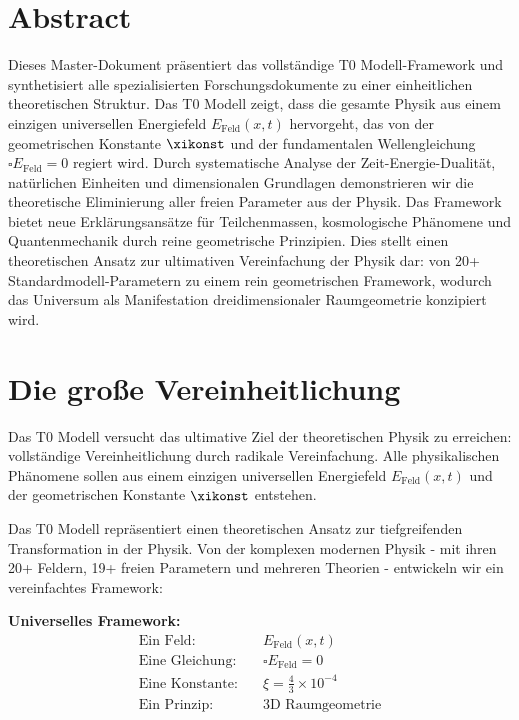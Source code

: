 
\section*{Abstract}
		Dieses Master-Dokument präsentiert das vollständige T0 Modell-Framework und synthetisiert alle spezialisierten Forschungsdokumente zu einer einheitlichen theoretischen Struktur. Das T0 Modell zeigt, dass die gesamte Physik aus einem einzigen universellen Energiefeld $E_{\text{Feld}}(x,t)$ hervorgeht, das von der geometrischen Konstante $\xikonst$ und der fundamentalen Wellengleichung $\square E_{\text{Feld}} = 0$ regiert wird. Durch systematische Analyse der Zeit-Energie-Dualität, natürlichen Einheiten und dimensionalen Grundlagen demonstrieren wir die theoretische Eliminierung aller freien Parameter aus der Physik. Das Framework bietet neue Erklärungsansätze für Teilchenmassen, kosmologische Phänomene und Quantenmechanik durch reine geometrische Prinzipien. Dies stellt einen theoretischen Ansatz zur ultimativen Vereinfachung der Physik dar: von 20+ Standardmodell-Parametern zu einem rein geometrischen Framework, wodurch das Universum als Manifestation dreidimensionaler Raumgeometrie konzipiert wird.


	
	\section{Die große Vereinheitlichung}
	
	\begin{revolutionaer}
		Das T0 Modell versucht das ultimative Ziel der theoretischen Physik zu erreichen: vollständige Vereinheitlichung durch radikale Vereinfachung. Alle physikalischen Phänomene sollen aus einem einzigen universellen Energiefeld $E_{\text{Feld}}(x,t)$ und der geometrischen Konstante $\xikonst$ entstehen.
	\end{revolutionaer}
	
	Das T0 Modell repräsentiert einen theoretischen Ansatz zur tiefgreifenden Transformation in der Physik. Von der komplexen modernen Physik - mit ihren 20+ Feldern, 19+ freien Parametern und mehreren Theorien - entwickeln wir ein vereinfachtes Framework:
	
	\begin{formel}
		\textbf{Universelles Framework:}
		\begin{align}
			\text{Ein Feld:} \quad &E_{\text{Feld}}(x,t) \\
			\text{Eine Gleichung:} \quad &\square E_{\text{Feld}} = 0 \\
			\text{Eine Konstante:} \quad &\xi = \frac{4}{3} \times 10^{-4} \\
			\text{Ein Prinzip:} \quad &\text{3D Raumgeometrie}
		\end{align}
	\end{formel}
	
